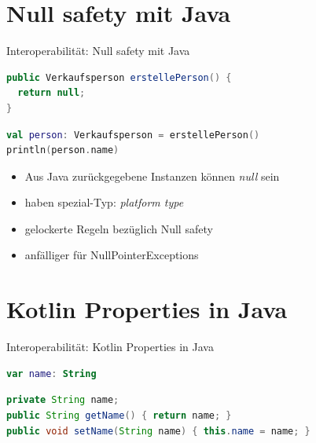 \documentclass{beamer}
\begin{document}
\section{Null safety mit Java}

\begin{frame}[fragile]{Interoperabilität: Null safety mit Java}
  \begin{lstlisting}[language=Java]
public Verkaufsperson erstellePerson() {
  return null;
}
  \end{lstlisting}
  \pause
  \begin{lstlisting}[language=Kotlin]
val person: Verkaufsperson = erstellePerson()
println(person.name)
  \end{lstlisting}
  \pause
  \begin{itemize}[<+->]
    \item Aus Java zurückgegebene Instanzen können \textit{null} sein
    \item haben spezial-Typ: \textit{platform type}
    \item gelockerte Regeln bezüglich Null safety
    \item anfälliger für NullPointerExceptions
  \end{itemize}
\end{frame}

\section{Kotlin Properties in Java}

\begin{frame}[fragile]{Interoperabilität: Kotlin Properties in Java}
  \begin{lstlisting}[language=Kotlin]
var name: String
    \end{lstlisting}
    \pause
    \begin{lstlisting}[language=Java]
private String name;
public String getName() { return name; }
public void setName(String name) { this.name = name; }
      \end{lstlisting}
\end{frame}
\end{document}
